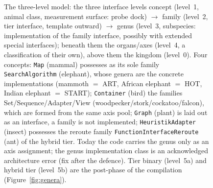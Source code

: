 \begin{nurkurz}
\begin{figure}[htbp]
\caption{The three-level model: the three interface levels concept (level~1, animal class, measurement surface: probe dock) $\to$ family (level~2, tier interface, template outward) $\to$ genus (level~3, subspecies: implementation of the family interface, possibly with extended special interfaces); beneath them the organs/axes (level~4, a classification of their own), above them the kingdom (level~0). Four concepts: \texttt{Map} (mammal) possesses as its sole family \texttt{SearchAlgorithm} (elephant), whose genera are the concrete implementations (mammoth $=$ ART, African elephant $=$ HOT, Indian elephant $=$ START); \texttt{Container} (bird) the families Set/Sequence/Adapter/View (woodpecker/stork/cockatoo/falcon), which are formed from the same axis pool; \texttt{Graph} (plant) is laid out as an interface, a family is not implemented; \texttt{HeuristikAdapter} (insect) possesses the reroute family \texttt{FunctionInterfaceReroute} (ant) of the hybrid tier. Today the code carries the genus only as an axis assignment; the genus implementation class is an acknowledged architecture error (fix after the defence). Tier binary (level~5a) and hybrid tier (level~5b) are the post-phase of the compilation (Figure~\ref{fig:genera}).}\label{fig:three-levels}
\end{figure}
\end{nurkurz}

